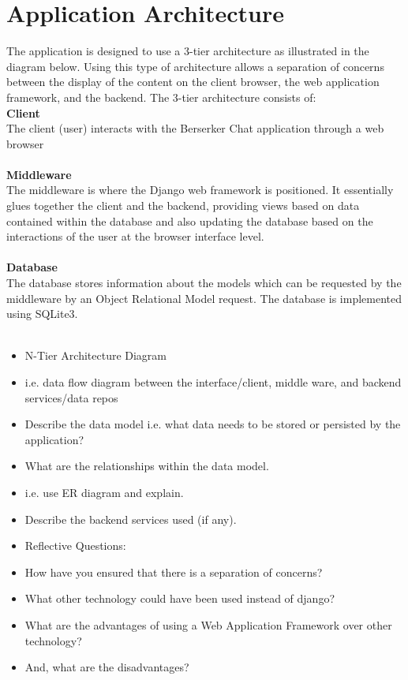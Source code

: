 \documentclass{sig-alt-release2}
\begin{document}
\section{Application Architecture}
The application is designed to use a 3-tier architecture as illustrated in the diagram below. Using this type of architecture allows
a separation of concerns between the display of the content on the client browser, the web application framework, and the backend.
The 3-tier architecture consists of: \\
\textbf{Client} \\
The client (user) interacts with the Berserker Chat application through a web browser\\ \\
\textbf{Middleware} \\
The middleware is where the Django web framework is positioned. It essentially glues together the client and the backend, providing views based on data contained within the database and also updating the database based on the interactions of the user at the browser interface level.\\ \\
\textbf{Database} \\
The database stores information about the models which can be requested by the middleware by an Object Relational Model request. The database is implemented using SQLite3.\\ \\

\begin{itemize}
\item	N-Tier Architecture Diagram %
\item	i.e. data flow diagram between the interface/client, middle ware, and backend services/data repos %
\item	Describe the data model i.e. what data needs to be stored or persisted by the application? %
\item	What are the relationships within the data model. %
\item	i.e. use ER diagram and explain. %
\item	Describe the backend services used (if any). %
\item	Reflective Questions: 
\item	How have you ensured that there is a separation of concerns? %
\item	What other technology could have been used instead of django? %
\item	What are the advantages of using a Web Application Framework over other technology? %
\item	And, what are the disadvantages? %
\end{itemize}
\end{document}
